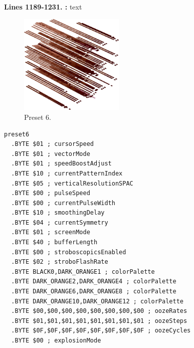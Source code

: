 \textbf{Lines 1189-1231. :} 
text
\clearpage

\clearpage
\begin{minipage}[b]{0.48\linewidth}
\begin{figure}[H]                                                          
  \centering                                                             
  \begin{adjustbox}{width=5cm,center}                                   
  \includegraphics[width=5cm]{src/colorspace_presets/preset6-45.png}%
  \end{adjustbox}                                                        
\caption*{Preset 6.}                                           
\end{figure}                                                               
\end{minipage}
\hspace{0.1cm}
\begin{minipage}[b]{0.48\linewidth}                            
\begin{lstlisting}[basicstyle=\ttfamily\tiny]
preset6
  .BYTE $01 ; cursorSpeed
  .BYTE $01 ; vectorMode
  .BYTE $01 ; speedBoostAdjust
  .BYTE $10 ; currentPatternIndex
  .BYTE $05 ; verticalResolutionSPAC
  .BYTE $00 ; pulseSpeed
  .BYTE $00 ; currentPulseWidth
  .BYTE $10 ; smoothingDelay
  .BYTE $04 ; currentSymmetry
  .BYTE $01 ; screenMode
  .BYTE $40 ; bufferLength
  .BYTE $00 ; stroboscopicsEnabled
  .BYTE $02 ; stroboFlashRate
  .BYTE BLACK0,DARK_ORANGE1 ; colorPalette
  .BYTE DARK_ORANGE2,DARK_ORANGE4 ; colorPalette
  .BYTE DARK_ORANGE6,DARK_ORANGE8 ; colorPalette
  .BYTE DARK_ORANGE10,DARK_ORANGE12 ; colorPalette
  .BYTE $00,$00,$00,$00,$00,$00,$00,$00 ; oozeRates
  .BYTE $01,$01,$01,$01,$01,$01,$01,$01 ; oozeSteps
  .BYTE $0F,$0F,$0F,$0F,$0F,$0F,$0F,$0F ; oozeCycles
  .BYTE $00 ; explosionMode
\end{lstlisting}
\end{minipage}

\vspace*{-0.5cm}

